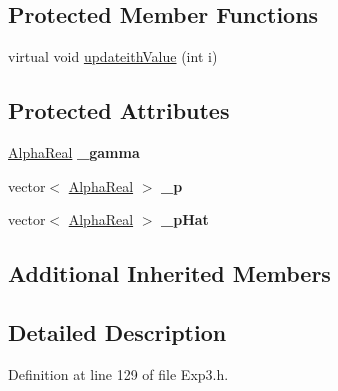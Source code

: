 \subsection*{Protected Member Functions}
\begin{DoxyCompactItemize}
\item 
virtual void \hyperlink{classMultiBoost_1_1Exp3_a2dc6188c0ede884c85d4d9c0354f29fa}{updateith\-Value} (int i)
\end{DoxyCompactItemize}
\subsection*{Protected Attributes}
\begin{DoxyCompactItemize}
\item 
\hypertarget{classMultiBoost_1_1Exp3_a069a7f5bcab20426c8f33173c4c0dc11}{\hyperlink{Defaults_8h_a80184c4fd10ab70a1a17c5f97dcd1563}{Alpha\-Real} {\bfseries \-\_\-gamma}}\label{classMultiBoost_1_1Exp3_a069a7f5bcab20426c8f33173c4c0dc11}

\item 
\hypertarget{classMultiBoost_1_1Exp3_aa49aa6b9c02da2bcd2144cc0644a9ac4}{vector$<$ \hyperlink{Defaults_8h_a80184c4fd10ab70a1a17c5f97dcd1563}{Alpha\-Real} $>$ {\bfseries \-\_\-p}}\label{classMultiBoost_1_1Exp3_aa49aa6b9c02da2bcd2144cc0644a9ac4}

\item 
\hypertarget{classMultiBoost_1_1Exp3_a41e68d77caf95c943299c5d49edce528}{vector$<$ \hyperlink{Defaults_8h_a80184c4fd10ab70a1a17c5f97dcd1563}{Alpha\-Real} $>$ {\bfseries \-\_\-p\-Hat}}\label{classMultiBoost_1_1Exp3_a41e68d77caf95c943299c5d49edce528}

\end{DoxyCompactItemize}
\subsection*{Additional Inherited Members}


\subsection{Detailed Description}


Definition at line 129 of file Exp3.\-h.



